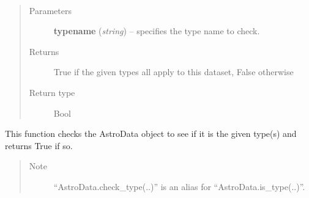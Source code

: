 \documentclass[letterpaper,10pt,english]{sphinxmanual}
\begin{document}
\begin{fulllineitems}
\label{chapter_AstroDataClass:astrodata.data.AstroData.is_type}~\begin{quote}\begin{description}
\item[{Parameters}] \leavevmode
\textbf{typename} (\emph{string}) -- specifies the type name to check.

\item[{Returns}] \leavevmode
True if the given types all apply to this dataset,
False otherwise

\item[{Return type}] \leavevmode
Bool

\end{description}\end{quote}

This function checks the AstroData object to see if it is the
given type(s) and returns True if so.
\begin{quote}\begin{description}
\item[{Note }] \leavevmode
``AstroData.check\_type(..)'' is an alias for 
``AstroData.is\_type(..)''.

\end{description}\end{quote}

\end{fulllineitems}


\end{document}
